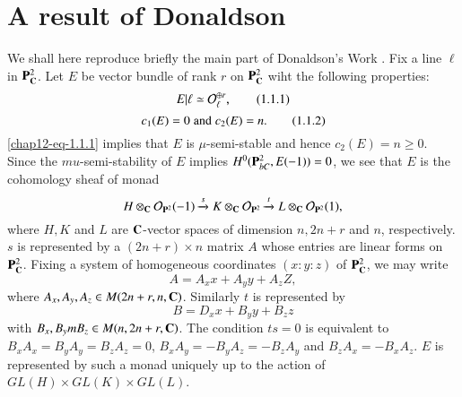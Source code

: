 \section{A result of Donaldson}\label{chap12-sec-1}
\pageoriginale
We shall here reproduce briefly the main part of Donaldson's Work \cite{chap12-key1}. Fix a line $\ell$ in $\mathbf{P}_{\mathbf{C}}^{2}$. Let $E$ be vector bundle of rank $r$ on $\mathbf{P}_{\mathbf{C}}^{2}$ wiht the following properties:
\begin{equation*}
E|\ell \simeq \mathcal{O}_{\ell}^{\oplus r},\tag{1.1.1} \label{chap12-eq-1.1.1}
\end{equation*}
\begin{equation*}
c_{1} (E) =0 \;{\rm and}\; c_{2}(E) =n.\tag{1.1.2}\label{chap12-eq-1.1.2}
\end{equation*}
\eqref{chap12-eq-1.1.1} implies that $E$ is $\mu$-semi-stable and hence $c_{2}(E)= n \geq 0$. Since the $mu$-semi-stability of $E$ implies $H^{0}(\mathbf{P}_{bC}^{2}, E(-1))=0$, we see that $E$ is the cohomology sheaf of monad
$$
H\otimes_{\mathbf{C}} \mathcal{O}_{\mathbf{P}^{2}}(-1)\xrightarrow{s} K \otimes_{\mathbf{C}} \mathcal{O}_{\mathbf{P}^{2}} \xrightarrow{t} L \otimes_{\mathbf{C}} \mathcal{O}_{\mathbf{P}^{2}}(1),
$$
where $H, K$ and $L$ are $\mathbf{C}$-vector spaces of dimension $n,2n +r$ and $n$, respectively. $s$ is represented by a $(2n +r)\times n$ matrix $A$ whose entries are linear forms on $\mathbf{P}_{\mathbf{C}}^{2}$. Fixing a system of homogeneous coordinates
$(x : y : z)$ of $\mathbf{P}_{\mathbf{C}}^{2}$, we may write
$$
A =A_{x}x + A_{y}y +A_{z}Z,
$$
where $A_{x}, A_{y}, A_{z} \in M(2n + r, n, \mathbf{C})$. Similarly $t$ is represented by
$$
B =D_{x}x +B_{y}y +B_{z}z
$$
with $B_{x}, B_{y}m B_{z} \in M(n, 2n + r, \mathbf{C})$. The condition $ts =0$ is equivalent to $B_{x}A_{x}=B_{y}A_{y} = B_{z}A_{z}=0$, $B_{x}A_{y} = -B_{y}A_{z} = -B_{z}A_{y}$ and $B_{z}A_{x} = -B_{x}A_{z}$. $E$ is represented by such a monad uniquely up to the action of $GL(H) \times GL(K) \times GL(L)$.

